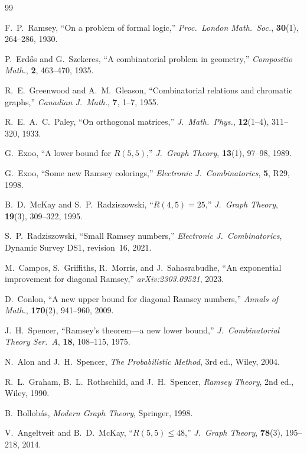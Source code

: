 \documentclass[12pt,a4paper]{article}
\theoremstyle{definition}
\theoremstyle{remark}
\begin{document}
\begin{thebibliography}{99}

F.~P.~Ramsey,
``On a problem of formal logic,''
\textit{Proc.\ London Math.\ Soc.}, \textbf{30}(1), 264--286, 1930.

P.~Erd\H{o}s and G.~Szekeres,
``A combinatorial problem in geometry,''
\textit{Compositio Math.}, \textbf{2}, 463--470, 1935.

R.~E.~Greenwood and A.~M.~Gleason,
``Combinatorial relations and chromatic graphs,''
\textit{Canadian J.\ Math.}, \textbf{7}, 1--7, 1955.

R.~E.~A.~C.~Paley,
``On orthogonal matrices,''
\textit{J.\ Math.\ Phys.}, \textbf{12}(1--4), 311--320, 1933.

G.~Exoo,
``A lower bound for $R(5,5)$,''
\textit{J.\ Graph Theory}, \textbf{13}(1), 97--98, 1989.

G.~Exoo,
``Some new Ramsey colorings,''
\textit{Electronic J.\ Combinatorics}, \textbf{5}, R29, 1998.

B.~D.~McKay and S.~P.~Radziszowski,
``$R(4,5) = 25$,''
\textit{J.\ Graph Theory}, \textbf{19}(3), 309--322, 1995.

S.~P.~Radziszowski,
``Small Ramsey numbers,''
\textit{Electronic J.\ Combinatorics}, Dynamic Survey DS1, revision~16, 2021.

M.~Campos, S.~Griffiths, R.~Morris, and J.~Sahasrabudhe,
``An exponential improvement for diagonal Ramsey,''
\textit{arXiv:2303.09521}, 2023.

D.~Conlon,
``A new upper bound for diagonal Ramsey numbers,''
\textit{Annals of Math.}, \textbf{170}(2), 941--960, 2009.

J.~H.~Spencer,
``Ramsey's theorem---a new lower bound,''
\textit{J.\ Combinatorial Theory Ser.~A}, \textbf{18}, 108--115, 1975.

N.~Alon and J.~H.~Spencer,
\textit{The Probabilistic Method}, 3rd ed., Wiley, 2004.

R.~L.~Graham, B.~L.~Rothschild, and J.~H.~Spencer,
\textit{Ramsey Theory}, 2nd ed., Wiley, 1990.

B.~Bollob{\'a}s,
\textit{Modern Graph Theory}, Springer, 1998.

V.~Angeltveit and B.~D.~McKay,
``$R(5,5) \le 48$,''
\textit{J.\ Graph Theory}, \textbf{78}(3), 195--218, 2014.


\end{thebibliography}
\end{document}
